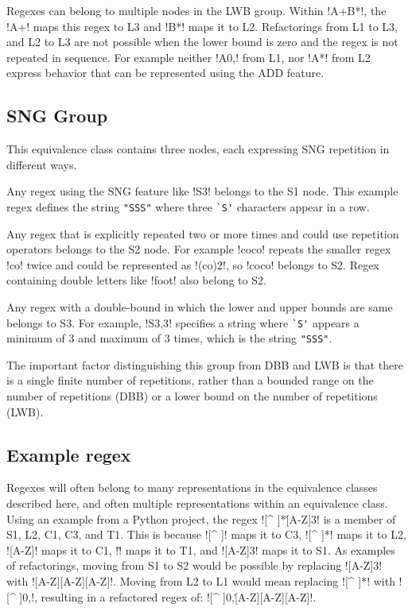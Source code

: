 Regexes can belong to multiple nodes in the LWB group.  Within \cverb!A+B*!, the \cverb!A+! maps this regex to L3 and \cverb!B*! maps it to L2. Refactorings from L1 to L3, and L2 to L3 are not possible when the lower bound is zero and the regex is not repeated in sequence.  For example neither \cverb!A{0,}! from L1, nor \cverb!A*! from L2 express behavior that can be represented using the ADD feature.

\subsection{SNG Group} This equivalence class contains three nodes, each expressing SNG repetition in different ways.

\begin{description}  \itemsep -1pt
\item[S1:] Any regex using the SNG feature like \cverb!S{3}! belongs to the S1 node. This example regex defines the string \verb!"SSS"! where three \verb!`S'! characters appear in a row.
\item[S2:] Any regex that is explicitly repeated two or more times and could use repetition operators belongs to the S2 node.  For example \cverb!coco! repeats the smaller regex \cverb!co! twice and could be represented as \cverb!(co){2}!, so \cverb!coco! belongs to S2.  Regex containing double letters like \cverb!foot! also belong to S2.
\item[S3:] Any regex with a double-bound in which the lower and upper bounds are same belongs to S3. For example, \cverb!S{3,3}! specifies a string where \verb!`S'! appears a minimum of 3 and maximum of 3 times, which is the string \verb!"SSS"!.
\end{description}

The important factor distinguishing this group from DBB and LWB is that there is a single finite number of repetitions, rather than a bounded range on the number of repetitions (DBB) or a lower bound on the number of repetitions (LWB).

\subsection{Example regex}
Regexes will often belong to many representations in the equivalence classes described here, and often multiple representations within an equivalence class.
Using an example from a Python project, the regex \cverb![^ ]*\.[A-Z]{3}! is a member of S1, L2, C1, C3, and T1. This is because \cverb![^ ]! maps it to C3, \cverb![^ ]*! maps it to L2, \cverb![A-Z]! maps it to C1, \cverb!\.! maps it to T1, and \cverb![A-Z]{3}! maps it to S1.
As examples of refactorings, moving from S1 to S2 would be possible by replacing \cverb![A-Z]{3}! with \cverb![A-Z][A-Z][A-Z]!.  Moving from L2 to L1 would mean replacing \cverb![^ ]*! with \cverb![^ ]{0,}!, resulting in a refactored regex of: \cverb![^ ]{0,}\.[A-Z][A-Z][A-Z]!.
